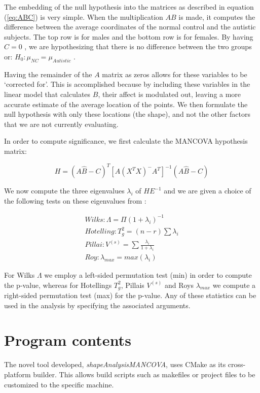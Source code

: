 \documentclass{InsightArticle}
\newcommand{\ProgramName}{\textit{shapeAnalysisMANCOVA}}
\begin{document}
The embedding of the null hypothesis into the matrices as described in equation (\ref{eq:ABC}) is very simple. When the multiplication $AB$ is made, 
it computes the difference between the average coordinates of the normal control and the autistic subjects. The top row is for males and the bottom row is for females. By having $C = 0$ , we are hypothesizing that there is no difference between the two groups or: $H_0 : \mu_{NC} = \mu_{Autistic}$ .

Having the remainder of the $A$ matrix as zeros allows for these variables to be `corrected for'. This is accomplished because by including these variables in the linear model that calculates $B$, their affect is modulated out, leaving a more accurate estimate of the average location of the points. We then formulate the null hypothesis with only these locations (the shape), and not the other factors that we are not currently evaluating.

In order to compute significance, we first calculate the MANCOVA hypothesis matrix:

\begin{equation}
H = (A\hat{B} - C)^T [A (X^TX)^- A^T]^{-1} (A\hat{B} - C)
\end{equation}

We now compute the three eigenvalues $\lambda_i$ of $H E^{-1}$ and we are given a choice of the following tests on these eigenvalues from \cite{Schlittgen09}:

\begin{eqnarray}
Wilks: \Lambda = \Pi(1 + \lambda_i)^{-1} \\
Hotelling: T^2_g =(n - r)\sum \lambda_i \\
Pillai : V^{(s)} = \sum \frac {\lambda_i} {1+ \lambda_i} \\
Roy : \lambda_{max} =max(\lambda_i)
\label{eq:stats}
\end{eqnarray}

For Wilks $\Lambda$ we employ a left-sided permutation test (min) in order to compute the p-value, whereas for Hotellings $T^2_g$, Pillais $V^{(s)}$ and Roys $\lambda_{max}$ we compute a right-sided permutation test (max) for the p-value. Any of these statistics can be used in the analysis by specifying the associated arguments.

\section{Program contents}
\label{sec:program}
The novel tool developed, \ProgramName, uses CMake \cite{CMake} as its cross-platform builder. This allows build scripts such as makefiles or project files to be customized to the specific machine.
\end{document}
